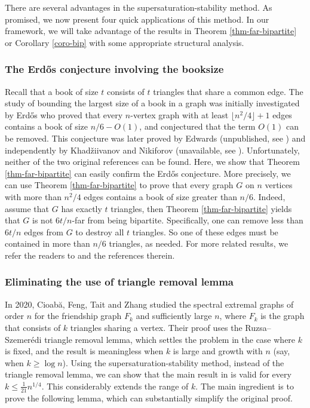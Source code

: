 \documentclass[11pt]{article}
\begin{document}
\label{sec4-3}

There are several advantages in the supersaturation-stability method. 
As promised, we now present four quick applications of this method. 
In our framework, 
we will take advantage of the results in Theorem \ref{thm-far-bipartite} or Corollary \ref{coro-bip} with some appropriate structural analysis. 



\subsubsection{The Erd\H{o}s conjecture involving the booksize}


Recall that a book of size $t$ consists of $t$ triangles 
that share a common edge. 
The study of bounding the largest size of a book in a graph was initially investigated by 
Erd\H{o}s \cite{Erd1962a} who proved that every $n$-vertex graph  with at least 
$\lfloor n^2/4\rfloor +1$ edges contains a book of size 
$n/6 - O(1)$,  and conjectured that the term $O(1)$ can be removed. This conjecture was later 
proved by Edwards (unpublished, see \cite[Lemma 4]{EFR1992}) 
and independently by Khad\v{z}iivanov and Nikiforov \cite{KN1979} (unavailable, see \cite{BN2005}). 
Unfortunately, neither of the two original references can be found.  
Here, we show that  Theorem \ref{thm-far-bipartite} 
can easily confirm the Erd\H{o}s conjecture.  
More precisely, we can use Theorem \ref{thm-far-bipartite}  
to prove that every graph $G$ 
on $n$ vertices with more than $n^2/4$ edges contains a book of size greater than $n/6$. 
Indeed, assume that $G$ has exactly $t$ triangles, then 
Theorem \ref{thm-far-bipartite}  yields that 
$G$ is not ${6t}/{n}$-far from being bipartite. 
Specifically, one can remove less than ${6t}/{n}$ edges from $G$ to destroy all $t$ triangles. So one of these edges must be contained in more than $n/6$ triangles, as needed. 
For more related results, we refer the readers to 
\cite{BN2005,Niki2021,ZL2022jgt} and the references therein. 


\subsubsection{Eliminating the use of triangle removal lemma}

In 2020, Cioab\u{a},  Feng, Tait and  Zhang \cite{CFTZ20} studied the spectral extremal graphs 
of order $n$ for the friendship graph $F_k$ and 
 sufficiently large $n$, where $F_k$ is the graph that consists of 
 $k$ triangles sharing a vertex. 
Their proof uses the Ruzsa--Szemer\'{e}di triangle removal lemma, 
which settles the problem in the case where $k$ is fixed,  and
the result is meaningless when $k$ is large and growth with $n$ 
(say, when $k\ge  \log n$).   
Using the supersaturation-stability method, 
instead of the triangle removal lemma, 
we can show that the main result in \cite{CFTZ20} is valid for every $k\le \frac{1}{21}n^{1/4}$. 
This considerably extends the range of $k$. 
The main ingredient is to prove the following lemma, 
which can substantially simplify the original proof. 
\end{document}
